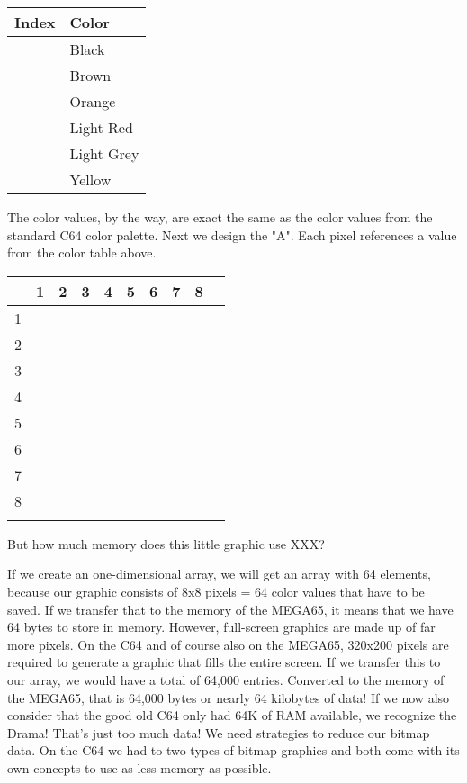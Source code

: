 \setlength\minrowclearance{4pt}
\begin{center}
\begin{tabular}{m{22pt}|m{60pt}}
	Index & Color \\\hline
	\blk & Black \\
	\bwn & Brown \\
	\ora & Orange \\
	\red & Light Red \\
	\lgr & Light Grey \\
	\yel & Yellow \\
\end{tabular}
\end{center}

The color values, by the way, are exact the same as the color values from the standard C64 color palette. Next we design the "A". Each pixel references a value from the color table above.


\setlength\minrowclearance{4pt}
\begin{center}
\begin{tabular}{m{4pt}|m{4pt}m{4pt}m{4pt}m{4pt}m{4pt}m{4pt}m{4pt}m{4pt}m{4pt}}
	& 1 & 2 & 3& 4& 5& 6& 7& 8 &\\\hline

	1 & \blk & \blk & \blk & \blk & \blk & \blk & \blk & \blk & \\
	2 & \red & \lgr & \yel & \lgr & \red & \ora & \blk & \blk & \\
	3 & \lgr & \lgr & \blk & \blk & \ora & \red & \blk & \blk & \\
	4 & \yel & \yel & \blk & \blk & \ora & \red & \blk & \blk & \\
	5 & \yel & \lgr & \lgr & \red & \red & \red & \blk & \blk & \\
	6 & \lgr & \red & \blk & \blk & \ora & \red & \blk & \blk & \\
	7 & \red & \red & \blk & \blk & \red & \red & \blk & \blk & \\
	8 & \ora & \bwn & \blk & \blk & \ora & \red & \blk & \blk & \\

	&&&&&&&&&
\end{tabular}
\end{center}

But how much memory does this little graphic use XXX?

If we create an one-dimensional array, we will get an array with 64 elements, because our graphic consists of 8x8 pixels = 64 color values that have to be saved. If we transfer that to the memory of the MEGA65, it means that we have 64 bytes to store in memory. However, full-screen graphics are made up of far more pixels. On the C64 and of course also on the MEGA65, 320x200 pixels are required to generate a graphic that fills the entire screen. If we transfer this to our array, we would have a total of 64,000 entries. Converted to the memory of the MEGA65, that is 64,000 bytes or nearly 64 kilobytes of data! If we now also consider that the good old C64 only had 64K of RAM available, we recognize the Drama! That's just too much data! We need strategies to reduce our bitmap data. On the C64 we had to two types of bitmap graphics and both come with its own concepts to use as less memory as possible.

